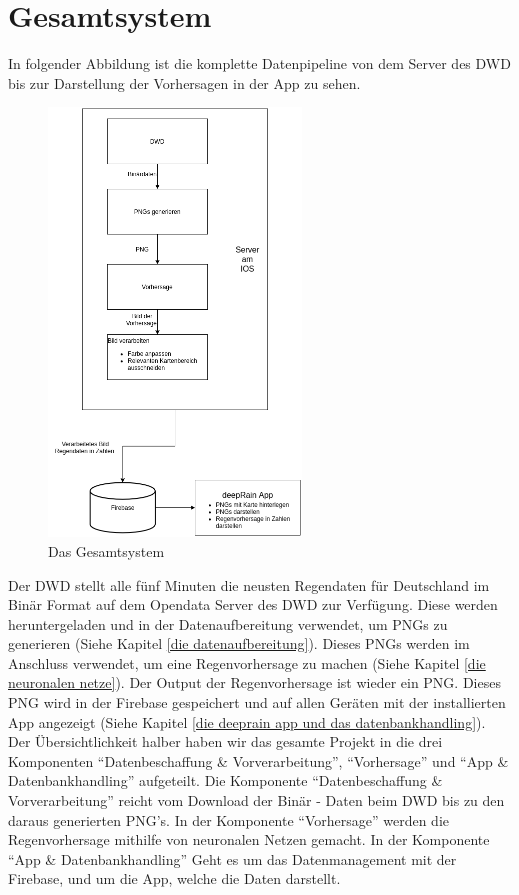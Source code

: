 \section{Gesamtsystem}\label{gesamtsystem}
In folgender Abbildung ist die komplette Datenpipeline von dem Server des DWD bis zur Darstellung der Vorhersagen in der App zu sehen.  

\begin{figure}[htb]
 \centering
 \includegraphics[width=0.6\textwidth,angle=0]{abb/Gesamtsystem}
 \caption[Das Gesamtsystem]{Das Gesamtsystem}
\label{fig:Beschreibung}
\end{figure}
\begin{sloppypar}
    \noindent
    Der DWD stellt alle fünf Minuten die neusten Regendaten für Deutschland im Binär Format auf dem Opendata Server des DWD zur Verfügung. 
    Diese werden heruntergeladen und in der Datenaufbereitung verwendet, um PNGs zu generieren (Siehe Kapitel \ref{die datenaufbereitung}). 
    Dieses PNGs werden im Anschluss verwendet, um eine Regenvorhersage zu machen (Siehe Kapitel \ref{die neuronalen netze}). 
    Der Output der Regenvorhersage ist wieder ein PNG. 
    Dieses PNG wird in der Firebase gespeichert und auf allen Geräten mit der installierten App angezeigt (Siehe Kapitel \ref{die deeprain app und das datenbankhandling}). 
    Der Übersichtlichkeit halber haben wir das gesamte Projekt in die drei Komponenten “Datenbeschaffung \& Vorverarbeitung”, “Vorhersage” und
    “App \& Datenbankhandling” aufgeteilt. 
    Die Komponente “Datenbeschaffung \& Vorverarbeitung” reicht vom Download der Binär - Daten beim DWD bis zu den daraus generierten PNG’s. 
    In der Komponente “Vorhersage” werden die Regenvorhersage mithilfe von neuronalen Netzen gemacht. In der Komponente “App \& Datenbankhandling” 
    Geht es um das Datenmanagement mit der Firebase, und um die App, welche die Daten darstellt.
\end{sloppypar}